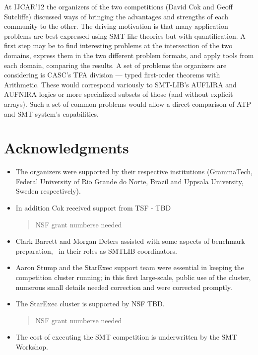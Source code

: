 \documentclass[twosize,11pt]{article}
\newcommand{\tjark}[1]{\begin{quote}\sc #1\marginpar{\textcolor{red}{$\ast^{\mbox{TW}}$}}\end{quote}}
\newcommand{\tjarkx}[1]{\tjark{#1}}
\begin{document}
At IJCAR'12 the organizers of the two competitions (David Cok and Geoff Sutcliffe) discussed ways of bringing the advantages and strengths of each community to the other. The driving motivation is that many application problems are best expressed using SMT-like theories but with quantification. A first step may be to find interesting problems at the 
intersection of the two domains, express them in the two different problem formats, and apply tools from each domain, comparing the results. A set of problems the organizers are considering is CASC's TFA division --- typed first-order theorems with Arithmetic. These would correspond variously to SMT-LIB's AUFLIRA and AUFNIRA logics or more specialized subsets of those (and without explicit arrays). Such a set of common problems would allow a direct comparison of ATP and SMT system's capabilities.
   


\section*{Acknowledgments} 
\begin{itemize}
\item The organizers were supported by their respective institutions (GrammaTech, Federal University of Rio Grande do Norte, Brazil and Uppsala University, Sweden respectively). 

\item In addition Cok received support from TSF - TBD\tjarkx{NSF grant numberse needed}

\item Clark Barrett and Morgan Deters assisted with some aspects of benchmark preparation, \
in their roles as SMTLIB coordinators.

\item Aaron Stump and the StarExec support team were essential in keeping the competition cluster running;
in this first large-scale, public use of the cluster, numerous small details needed correction and were corrected promptly.

\item The StarExec cluster is supported by NSF TBD.\tjarkx{NSF grant numberse needed}

\item The cost of executing the SMT competition is underwritten by the SMT Workshop. 
\end{itemize}



\end{document}
